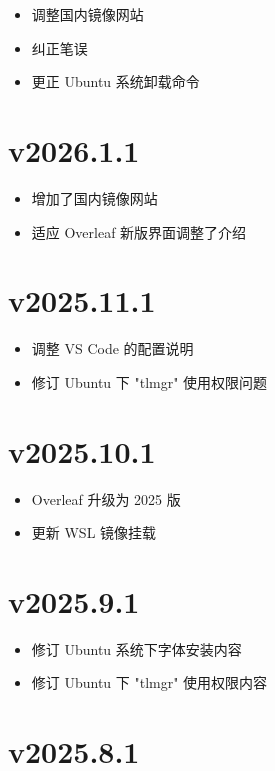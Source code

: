 \begin{itemize}
  \item 调整国内镜像网站
  \item 纠正笔误
  \item 更正 Ubuntu 系统卸载命令
\end{itemize}

\section*{v2026.1.1}

\begin{itemize}
  \item 增加了国内镜像网站
  \item 适应 Overleaf 新版界面调整了介绍
\end{itemize}

\section*{v2025.11.1}

\begin{itemize}
  \item 调整 VS Code 的配置说明
  \item 修订 Ubuntu 下 "tlmgr" 使用权限问题
\end{itemize}

\section*{v2025.10.1}

\begin{itemize}
  \item Overleaf 升级为 2025 版
  \item 更新 WSL 镜像挂载
\end{itemize}

\section*{v2025.9.1}

\begin{itemize}
  \item 修订 Ubuntu 系统下字体安装内容
  \item 修订 Ubuntu 下 "tlmgr" 使用权限内容
\end{itemize}

\section*{v2025.8.1}

